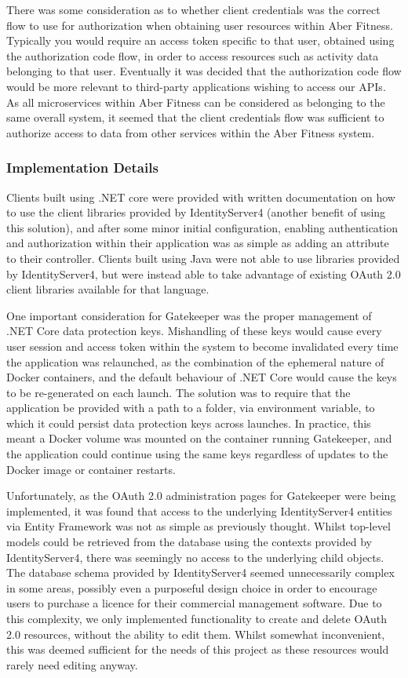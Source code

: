 There was some consideration as to whether client credentials was the correct flow to use for authorization when obtaining user resources within Aber Fitness. Typically you would require an access token specific to that user, obtained using the authorization code flow, in order to access resources such as activity data belonging to that user. Eventually it was decided that the authorization code flow would be more relevant to third-party applications wishing to access our APIs. As all microservices within Aber Fitness can be considered as belonging to the same overall system, it seemed that the client credentials flow was sufficient to authorize access to data from other services within the Aber Fitness system.

\subsubsection{Implementation Details}

Clients built using .NET core were provided with written documentation on how to use the client libraries provided by IdentityServer4 (another benefit of using this solution), and after some minor initial configuration, enabling authentication and authorization within their application was as simple as adding an attribute to their controller. Clients built using Java were not able to use libraries provided by IdentityServer4, but were instead able to take advantage of existing OAuth 2.0 client libraries available for that language.

One important consideration for Gatekeeper was the proper management of .NET Core data protection keys. Mishandling of these keys would cause every user session and access token within the system to become invalidated every time the application was relaunched, as the combination of the ephemeral nature of Docker containers, and the default behaviour of .NET Core would cause the keys to be re-generated on each launch. The solution was to require that the application be provided with a path to a folder, via environment variable, to which it could persist data protection keys across launches. In practice, this meant a Docker volume was mounted on the container running Gatekeeper, and the application could continue using the same keys regardless of updates to the Docker image or container restarts.

Unfortunately, as the OAuth 2.0 administration pages for Gatekeeper were being implemented, it was found that access to the underlying IdentityServer4 entities via Entity Framework was not as simple as previously thought. Whilst top-level models could be retrieved from the database using the contexts provided by IdentityServer4, there was seemingly no access to the underlying child objects. The database schema provided by IdentityServer4 seemed unnecessarily complex in some areas, possibly even a purposeful design choice in order to encourage users to purchase a licence for their commercial management software\cite{identityserver4adminui}. Due to this complexity, we only implemented functionality to create and delete OAuth 2.0 resources, without the ability to edit them. Whilst somewhat inconvenient, this was deemed sufficient for the needs of this project as these resources would rarely need editing anyway.

